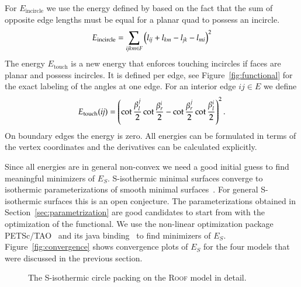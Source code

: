 \documentclass[Thesis.tex]{subfiles}
\begin{document}
For $E_{\mathrm{incircle}}$ we use the energy defined by
\cite{Schiftner2009} based on the fact that the sum of opposite edge
lengths must be equal for a planar quad to possess an incircle.
\begin{equation}
E_{\mathrm{incircle}} = \sum_{\mathrm{\it{ijkm}} \in F} \left( l_{\mathrm{\it{ij}}} + 
l_{\mathrm{\it{km}}} - l_{\mathrm{\it{jk}}} - l_{\mathrm{\it{mi}}} \right)^2
\end{equation}
The energy
$E_{\mathrm{touch}}$ is a new energy that enforces touching incircles
if faces are planar and possess incircles.  It is defined per edge, see
Figure~\ref{fig:functional} for the exact labeling of the angles at one edge.
For an interior edge $ij\in E$ we define
\begin{equation}
  E_{\mathrm{touch}}(\mathrm{\it{ij}})=
  \left(\cot\frac{\beta^j_l}{2}\cot\frac{\beta^i_r}{2} - 
\cot\frac{\beta^j_r}{2}\cot\frac{\beta^i_l}{2}\right)^2.
\end{equation}
On boundary edges the energy is zero. All energies can be formulated 
in terms of the vertex coordinates and the derivatives can be calculated explicitly.

Since all energies are in general non-convex we need a good initial guess to 
find meaningful minimizers of $E_S$.
S-isothermic minimal surfaces converge to isothermic parameterizations of
smooth minimal surfaces~\cite{BobHofSpr06}. For general S-isothermic surfaces
this is an open conjecture. The parameterizations obtained in
Section~\ref{sec:parametrization} are good candidates to start from with the
optimization of the functional.
We use the non-linear optimization package PETSc/TAO~\cite{petsc-web-page,
tao-user-ref} and its java binding~\cite{jpetsctao-web-page} to find
minimizers of $E_S$. Figure~\ref{fig:convergence} shows convergence plots of
$E_S$ for the four models that were discussed in the previous section.
\begin{figure}
\centering
{}
\caption{The S-isothermic circle packing on the \textsc{Roof} model in detail.}
\end{figure}
\end{document}
